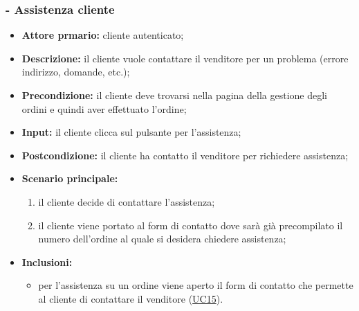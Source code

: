 \subsubsection{ - Assistenza cliente}
\begin{itemize}
    \item \textbf{Attore prmario:} cliente autenticato;
    \item \textbf{Descrizione:} il cliente vuole contattare il venditore per un problema (errore indirizzo, domande, etc.);
    \item \textbf{Precondizione:} il cliente deve trovarsi nella pagina della gestione degli ordini e quindi aver effettuato l'ordine;
    \item \textbf{Input:} il cliente clicca sul pulsante per l'assistenza;
    \item \textbf{Postcondizione:} il cliente ha contatto il venditore per richiedere assistenza;
    \item \textbf{Scenario principale:}
          \begin{enumerate}
              \item il cliente decide di contattare l'assistenza;
              \item il cliente viene portato al form di contatto dove sarà già precompilato il numero dell'ordine al quale si desidera chiedere assistenza;
          \end{enumerate}
    \item \textbf{Inclusioni:}
          \begin{itemize}
              \item per l'assistenza su un ordine viene aperto il form di contatto che permette al cliente di contattare il venditore (\hyperref[UC15]{UC15}).
          \end{itemize}
\end{itemize}

\stepsubUserCase
